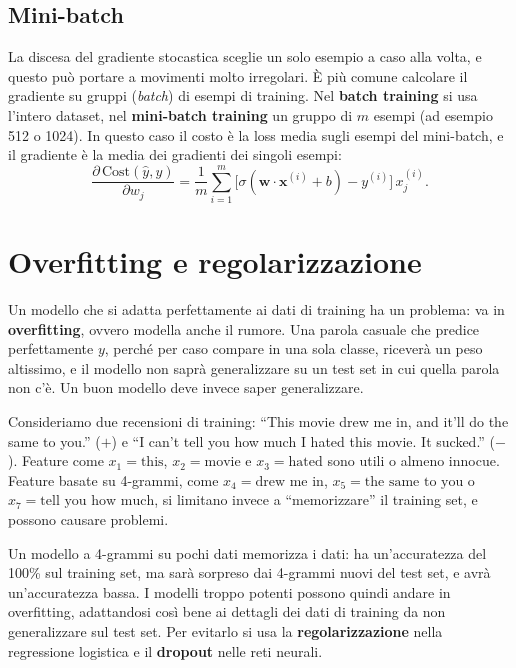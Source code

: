 \subsection{Mini-batch}
La discesa del gradiente stocastica sceglie un solo esempio a caso alla volta, e questo può portare a movimenti molto irregolari. È più comune calcolare il gradiente su gruppi (\textit{batch}) di esempi di training. Nel \textbf{batch training} si usa l'intero dataset, nel \textbf{mini-batch training} un gruppo di $m$ esempi (ad esempio 512 o 1024). In questo caso il costo è la loss media sugli esempi del mini-batch, e il gradiente è la media dei gradienti dei singoli esempi:
\begin{equation}
\frac{\partial\, \text{Cost}(\hat{y}, y)}{\partial w_j} = \frac{1}{m} \sum_{i=1}^{m} \big[\sigma(\mathbf{w} \cdot \mathbf{x}^{(i)} + b) - y^{(i)}\big]\, x_j^{(i)}.
\end{equation}

\section{Overfitting e regolarizzazione}
Un modello che si adatta perfettamente ai dati di training ha un problema: va in \textbf{overfitting}, ovvero modella anche il rumore. Una parola casuale che predice perfettamente $y$, perché per caso compare in una sola classe, riceverà un peso altissimo, e il modello non saprà generalizzare su un test set in cui quella parola non c'è. Un buon modello deve invece saper generalizzare.

Consideriamo due recensioni di training: \enquote{This movie drew me in, and it'll do the same to you.} ($+$) e \enquote{I can't tell you how much I hated this movie. It sucked.} ($-$). Feature come $x_1 = \text{this}$, $x_2 = \text{movie}$ e $x_3 = \text{hated}$ sono utili o almeno innocue. Feature basate su 4-grammi, come $x_4 = \text{drew me in}$, $x_5 = \text{the same to you}$ o $x_7 = \text{tell you how much}$, si limitano invece a \enquote{memorizzare} il training set, e possono causare problemi.

Un modello a 4-grammi su pochi dati memorizza i dati: ha un'accuratezza del 100\% sul training set, ma sarà sorpreso dai 4-grammi nuovi del test set, e avrà un'accuratezza bassa. I modelli troppo potenti possono quindi andare in overfitting, adattandosi così bene ai dettagli dei dati di training da non generalizzare sul test set. Per evitarlo si usa la \textbf{regolarizzazione} nella regressione logistica e il \textbf{dropout} nelle reti neurali.

